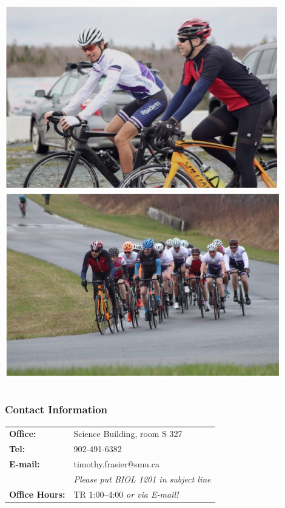 \documentclass[10pt]{beamer}
\begin{document}
\begin{frame}
\begin{columns}
		\begin{column}{0.4\textwidth}
			\includegraphics[width=0.9\textwidth]{figures/cycling1.png}\\
			\vspace{0.5cm}
			\includegraphics[width=0.9\textwidth]{figures/cycling2.png}\\
		\end{column}
	\end{columns}
\end{frame}


\begin{frame}[t]
\frametitle{Contact Information}
\vspace{0.5cm}

	\begin{tabular}{@{} l l}
		\textbf{Office:} & Science Building, room S 327\\
		\addlinespace
		\addlinespace
		\textbf{Tel:} & 902-491-6382\\
		\addlinespace
		\addlinespace
		\textbf{E-mail:} & timothy.frasier@smu.ca\\
				& \textcolor{myblue2}{\emph{Please put BIOL 1201 in subject line}}\\
		\addlinespace
		\addlinespace
		\textbf{Office Hours:} & TR 1:00--4:00 \textcolor{myblue2}{\emph{or via E-mail!}}\\
		
	\end{tabular}
\end{frame}
\end{document}
